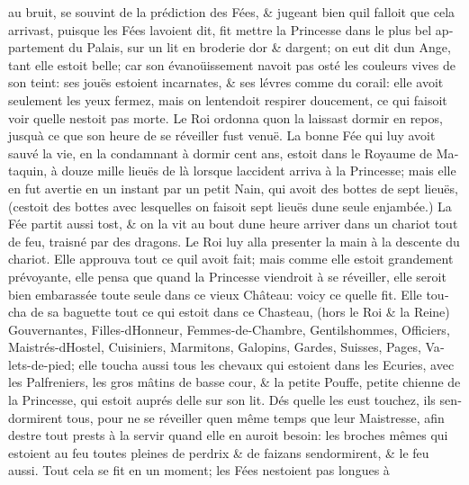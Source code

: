 \documentclass[14pt,a4paper]{memoir}
\begin{document}
\begin{otherlanguage}{french}
au bruit, se souvint de la prédiction des Fées, \& jugeant bien
qu\textquotesingle il falloit que cela arrivast, puisque les Fées
l\textquotesingle avoient dit, fit mettre la Princesse dans le plus bel
appartement du Palais, sur un lit en broderie d\textquotesingle or \&
d\textquotesingle argent; on eut dit d\textquotesingle un Ange, tant
elle estoit belle; car son évanoüissement n\textquotesingle avoit pas
osté les couleurs vives de son teint: ses jouës estoient incarnates, \&
ses lévres comme du corail: elle avoit seulement les yeux fermez, mais
on l\textquotesingle entendoit respirer doucement, ce qui faisoit voir
qu\textquotesingle elle n\textquotesingle estoit pas morte. Le Roi
ordonna qu\textquotesingle on la laissast dormir en repos,
jusqu\textquotesingle à ce que son heure de se réveiller fust venuë. La
bonne Fée qui luy avoit sauvé la vie, en la condamnant à dormir cent
ans, estoit dans le Royaume de Mataquin, à douze mille lieuës de là
lorsque l\textquotesingle accident arriva à la Princesse; mais elle en
fut avertie en un instant par un petit Nain, qui avoit des bottes de
sept lieuës, (c\textquotesingle estoit des bottes avec lesquelles on
faisoit sept lieuës d\textquotesingle une seule enjambée.) La Fée partit
aussi tost, \& on la vit au bout d\textquotesingle une heure arriver
dans un chariot tout de feu, traisné par des dragons. Le Roi luy alla
presenter la main à la descente du chariot. Elle approuva tout ce
qu\textquotesingle il avoit fait; mais comme elle estoit grandement
prévoyante, elle pensa que quand la Princesse viendroit à se réveiller,
elle seroit bien embarassée toute seule dans ce vieux Château: voicy ce
qu\textquotesingle elle fit. Elle toucha de sa baguette tout ce qui
estoit dans ce Chasteau, (hors le Roi \& la Reine) Gouvernantes,
Filles-d\textquotesingle Honneur, Femmes-de-Chambre, Gentilshommes,
Officiers, Maistrés-d\textquotesingle Hostel, Cuisiniers, Marmitons,
Galopins, Gardes, Suisses, Pages, Valets-de-pied; elle toucha aussi tous
les chevaux qui estoient dans les Ecuries, avec les Palfreniers, les
gros mâtins de basse cour, \& la petite Pouffe, petite chienne de la
Princesse, qui estoit auprés d\textquotesingle elle sur son lit. Dés
qu\textquotesingle elle les eust touchez, ils
s\textquotesingle endormirent tous, pour ne se réveiller
qu\textquotesingle en même temps que leur Maistresse, afin
d\textquotesingle estre tout prests à la servir quand elle en auroit
besoin: les broches mêmes qui estoient au feu toutes pleines de perdrix
\& de faizans s\textquotesingle endormirent, \& le feu aussi. Tout cela
se fit en un moment; les Fées n\textquotesingle estoient pas longues à

\end{otherlanguage}
\end{document}
